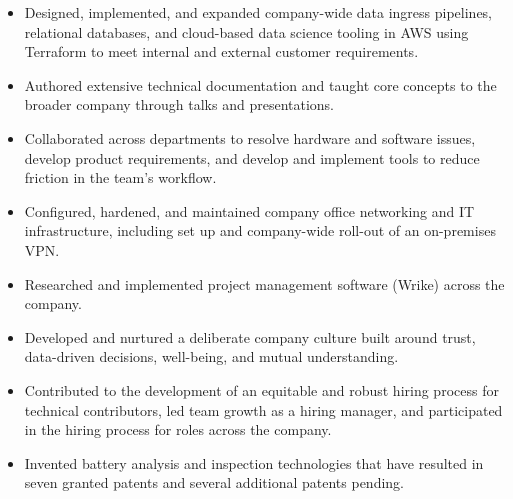 \documentclass[9pt,letterpaper]{article}
\begin{document}
{{\begin{itemize}
{\begin{itemize}
        \item Designed, implemented, and expanded company-wide data ingress pipelines, relational databases, and cloud-based data science tooling in AWS using Terraform to meet internal and external customer requirements.


        \item Authored extensive technical documentation and taught core concepts to the broader company through talks and presentations.

        \item Collaborated across departments to resolve hardware and software issues, develop product requirements, and develop and implement tools to reduce friction in the team's workflow.
        
        \item Configured, hardened, and maintained company office networking and IT infrastructure, including set up and company-wide roll-out of an on-premises VPN.
        
        \item Researched and implemented project management software (Wrike) across the company.

        \item Developed and nurtured a deliberate company culture built around trust, data-driven decisions, well-being, and mutual understanding.

        \item Contributed to the development of an equitable and robust hiring process for technical contributors, led team growth as a hiring manager, and participated in the hiring process for roles across the company.


        \item Invented battery analysis and inspection technologies that have resulted in seven granted patents and several additional patents pending.
        
    \end{itemize}}
    

\end{itemize}}}
\end{document}
